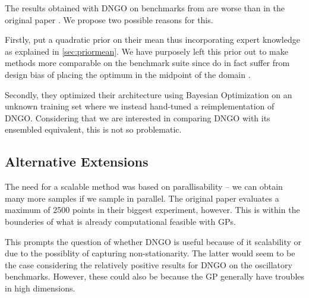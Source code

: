 \documentclass[conference,compsoc]{IEEEtran}
\theoremstyle{definition}
\begin{document}
        The results obtained with DNGO on benchmarks from \parencite{eggensperger_towards_2013} are worse than in the original paper \parencite{snoek_scalable_2015}.
        We propose two possible reasons for this.

        Firstly, \parencite{snoek_scalable_2015} put a quadratic prior on their mean thus incorporating expert knowledge as explained in \cref{sec:priormean}. 
        We have purposely left this prior out to make methods more comparable on the benchmark suite since \parencite{eggensperger_towards_2013} do in fact suffer from design bias of placing the optimum in the midpoint of the domain \parencite{dewancker_stratified_2016}.

        Secondly, they optimized their architecture using Bayesian Optimization on an unknown training set where we instead hand-tuned a reimplementation of DNGO.
        Considering that we are interested in comparing DNGO with its ensembled equivalent, this is not so problematic.





    \subsection{Alternative Extensions}\label{sec:disc-extensions}

        The need for a scalable method was based on parallisability -- we can obtain many more samples if we sample in parallel.
        The original paper \parencite{snoek_scalable_2015} evaluates a maximum of 2500 points in their biggest experiment, however.
        This is within the bounderies of what is already computational feasible with GPs.

        This prompts the question of whether DNGO is useful because of it scalability or due to the possiblity of capturing non-stationarity.
        The latter would seem to be the case considering the relatively positive results for DNGO on the oscillatory benchmarks.
        However, these could also be because the GP generally have troubles in high dimensions. %
\end{document}
